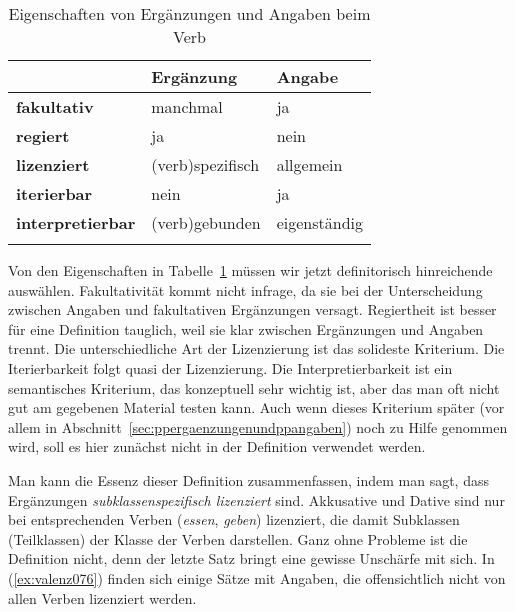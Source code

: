 \begin{table}[!htbp]
  \centering
  \begin{tabular}{lll}
    \lsptoprule
    & \textbf{Ergänzung} & \textbf{Angabe} \\
    \midrule
    \textbf{fakultativ} & manchmal & ja \\
    \textbf{regiert} & ja & nein \\
    \textbf{lizenziert} & (verb)spezifisch & allgemein \\
    \textbf{iterierbar} & nein & ja \\
    \textbf{interpretierbar} & (verb)gebunden & eigenständig \\
    \lspbottomrule
  \end{tabular}
  \caption{Eigenschaften von Ergänzungen und Angaben beim Verb}
  \label{tab:valenz075}
\end{table}


Von den Eigenschaften in Tabelle~\ref{tab:valenz075} müssen wir jetzt definitorisch hinreichende auswählen.
Fakultativität kommt nicht infrage, da sie bei der Unterscheidung zwischen Angaben und fakultativen Ergänzungen versagt.
Regiertheit ist besser für eine Definition tauglich, weil sie klar zwischen Ergänzungen und Angaben trennt.
Die unterschiedliche Art der Lizenzierung ist das solideste Kriterium.
Die Iterierbarkeit folgt quasi der Lizenzierung.
Die Interpretierbarkeit ist ein semantisches Kriterium, das konzeptuell sehr wichtig ist, aber das man oft nicht gut am gegebenen Material testen kann.
Auch wenn dieses Kriterium später (vor allem in Abschnitt~\ref{sec:ppergaenzungenundppangaben}) noch zu Hilfe genommen wird, soll es hier zunächst nicht in der Definition verwendet werden.



Man kann die Essenz dieser Definition zusammenfassen, indem man sagt, dass Ergänzungen \textit{subklassenspezifisch lizenziert} sind.
Akkusative und Dative sind \zB nur bei entsprechenden Verben (\zB \textit{essen}, \textit{geben}) lizenziert, die damit Subklassen (Teilklassen) der Klasse der Verben darstellen.
Ganz ohne Probleme ist die Definition nicht, denn der letzte Satz bringt eine gewisse Unschärfe mit sich.
In (\ref{ex:valenz076}) finden sich einige Sätze mit Angaben, die offensichtlich nicht von allen Verben lizenziert werden.

